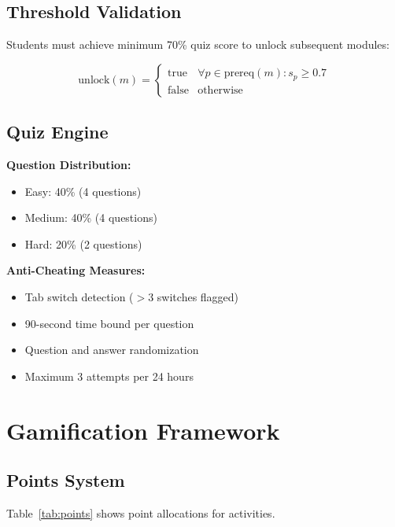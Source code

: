 \documentclass[conference]{IEEEtran}
\begin{document}
\subsection{Threshold Validation}

Students must achieve minimum 70\% quiz score to unlock subsequent modules:

\begin{equation}
\text{unlock}(m) = \begin{cases}
\text{true} & \forall p \in \text{prereq}(m): s_p \geq 0.7 \\
\text{false} & \text{otherwise}
\end{cases}
\end{equation}

\subsection{Quiz Engine}

\textbf{Question Distribution:}
\begin{itemize}
    \item Easy: 40\% (4 questions)
    \item Medium: 40\% (4 questions)
    \item Hard: 20\% (2 questions)
\end{itemize}

\textbf{Anti-Cheating Measures:}
\begin{itemize}
    \item Tab switch detection ($>$3 switches flagged)
    \item 90-second time bound per question
    \item Question and answer randomization
    \item Maximum 3 attempts per 24 hours
\end{itemize}

\section{Gamification Framework}

\subsection{Points System}

Table~\ref{tab:points} shows point allocations for activities.
\end{document}
